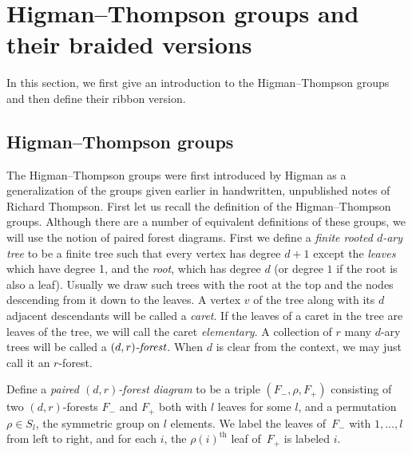 \documentclass[11pt, a4paper]{amsart}
\theoremstyle{definition}
\begin{document}
\section{Higman--Thompson groups and their braided versions}\label{sec:braidedgroups}
In this section, we first give an introduction to the Higman--Thompson groups and then define their ribbon version. 

\subsection{Higman--Thompson groups} The Higman--Thompson groups were first introduced by Higman as a generalization of the groups \cite{Hi74} given earlier in handwritten, unpublished notes of Richard Thompson.
First let us recall the definition of the Higman--Thompson groups. Although there are a number of equivalent definitions of these groups, we will use the notion of paired forest diagrams. First we define a \emph{finite rooted $d$-ary tree} to be a finite tree such that every vertex has degree $d+1$ except the \emph{leaves} which have degree 1, and the \emph{root}, which has degree $d$ (or degree $1$ if the root is also a leaf). Usually we draw such trees with the root at the top and the nodes descending from it down to the leaves. A vertex $v$ of the tree along with its $d$ adjacent descendants will be called a \emph{caret}. If the leaves of a caret in the tree are leaves of the tree, we will call the caret \emph{elementary}.  A collection of $r$ many $d$-ary trees will be called a $\emph{$(d,r)$-forest}$. When $d$ is clear from the context, we may just call it an $r$-forest.


Define a \emph{paired $(d,r)$-forest diagram} to be a triple $(F_-,\rho,F_+)$
consisting of two $(d,r)$-forests $F_-$ and $F_+$ both with $l$ leaves for some $l$, and a permutation $\rho \in S_l$, the symmetric group on $l$ elements.  We label the leaves
of~$F_-$ with $1,\dots,l$ from left to right, and for each $i$,
the $\rho(i)^{\text{th}}$ leaf of~$F_+$ is labeled $i$. 
\end{document}
